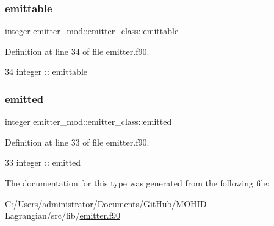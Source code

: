 \subsubsection{\texorpdfstring{emittable}{emittable}}
{\footnotesize\ttfamily integer emitter\+\_\+mod\+::emitter\+\_\+class\+::emittable\hspace{0.3cm}{\ttfamily [private]}}



Definition at line 34 of file emitter.\+f90.


\begin{DoxyCode}
34         \textcolor{keywordtype}{integer} :: emittable
\end{DoxyCode}
\mbox{\label{structemitter__mod_1_1emitter__class_aa8f56d34f32e452a2e78f93f44780b4b}} 
\subsubsection{\texorpdfstring{emitted}{emitted}}
{\footnotesize\ttfamily integer emitter\+\_\+mod\+::emitter\+\_\+class\+::emitted\hspace{0.3cm}{\ttfamily [private]}}



Definition at line 33 of file emitter.\+f90.


\begin{DoxyCode}
33         \textcolor{keywordtype}{integer} :: emitted
\end{DoxyCode}


The documentation for this type was generated from the following file\+:\begin{DoxyCompactItemize}
\item 
C\+:/\+Users/administrator/\+Documents/\+Git\+Hub/\+M\+O\+H\+I\+D-\/\+Lagrangian/src/lib/\mbox{\hyperlink{emitter_8f90}{emitter.\+f90}}\end{DoxyCompactItemize}
